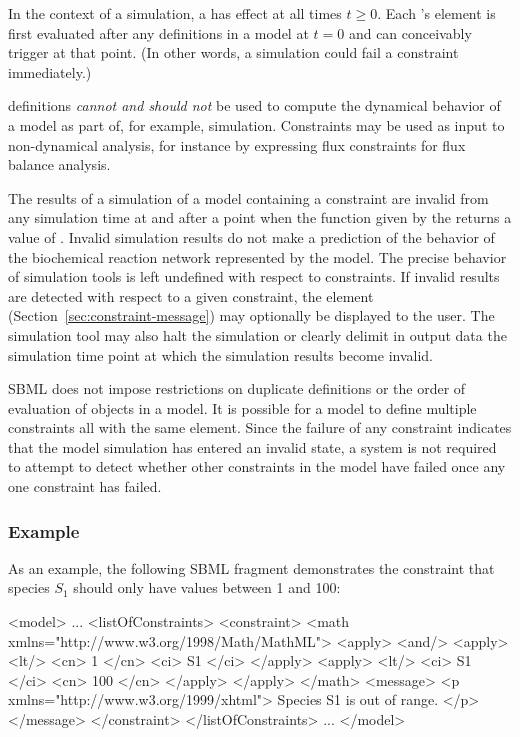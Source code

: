 In the context of a simulation, a \Constraint has effect at all
times $t \geq 0$.  Each \Constraint's  element is first
evaluated after any \InitialAssignment definitions in a model at
$t = 0$ and can conceivably trigger at that point.  (In other
words, a simulation could fail a constraint immediately.)

\Constraint definitions \emph{cannot and should not} be used to
compute the dynamical behavior of a model as part of, for example,
simulation.  Constraints may be used as input to non-dynamical
analysis, for instance by expressing flux constraints for flux
balance analysis.

The results of a simulation of a model containing a constraint are
invalid from any simulation time at and after a point when the
function given by the  returns a value of .
Invalid simulation results do not make a prediction of the
behavior of the biochemical reaction network represented by the
model.  The precise behavior of simulation tools is left undefined
with respect to constraints.  If invalid results are detected with
respect to a given constraint, the  element
(Section~\ref{sec:constraint-message}) may optionally be displayed
to the user.  The simulation tool may also halt the simulation or
clearly delimit in output data the simulation time point at which
the simulation results become invalid.

SBML does not impose restrictions on duplicate \Constraint
definitions or the order of evaluation of \Constraint objects in a
model.  It is possible for a model to define multiple constraints
all with the same  element.  Since the failure of any
constraint indicates that the model simulation has entered an
invalid state, a system is not required to attempt to detect
whether other constraints in the model have failed once any one
constraint has failed.


\subsubsection{Example}

As an example, the following SBML fragment demonstrates the
constraint that species $S_1$ should only have values between 1
and 100:

\begin{example}
<model>
    ...
    <listOfConstraints>
        <constraint>
            <math xmlns="http://www.w3.org/1998/Math/MathML">
                <apply>
                    <and/>
                        <apply> <lt/> <cn> 1 </cn> <ci> S1 </ci> </apply>
                        <apply> <lt/> <ci> S1 </ci> <cn> 100 </cn> </apply>
                </apply>
            </math>
            <message>
                <p xmlns="http://www.w3.org/1999/xhtml"> Species S1 is out of range. </p>
            </message>
        </constraint>
    </listOfConstraints>
    ...
</model>
\end{example}



